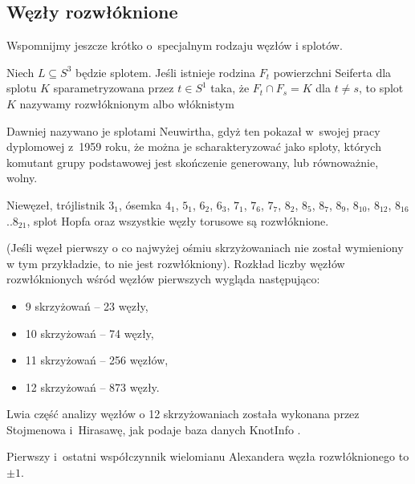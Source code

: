 
\subsection{Węzły rozwłóknione}
%
Wspomnijmy jeszcze krótko o~specjalnym rodzaju węzłów i splotów.

\begin{definition}
    Niech $L \subseteq S^3$ będzie splotem.
    Jeśli istnieje rodzina $F_t$ powierzchni Seiferta dla splotu $K$ sparametryzowana przez $t \in S^1$ taka, że $F_t \cap F_s = K$ dla $t \neq s$, to splot $K$ nazywamy rozwłóknionym albo włóknistym
\end{definition}

%
Dawniej nazywano je splotami Neuwirtha, gdyż ten pokazał w~swojej pracy dyplomowej z~1959 roku, że można je scharakteryzować jako sploty, których komutant grupy podstawowej jest skończenie generowany, lub równoważnie, wolny.

\begin{example}
    Niewęzeł, trójlistnik $3_1$, ósemka $4_1$, $5_{1}$, $6_{2}$, $6_{3}$, $7_{1}$, $7_{6}$, $7_{7}$, $8_{2}$, $8_{5}$, $8_{7}$, $8_{9}$, $8_{10}$, $8_{12}$, $8_{16}$..$8_{21}$, splot Hopfa oraz wszystkie węzły torusowe są rozwłóknione.
\end{example}

(Jeśli węzeł pierwszy o co najwyżej ośmiu skrzyżowaniach nie został wymieniony w tym przykładzie, to nie jest rozwłókniony).
Rozkład liczby węzłów rozwłóknionych wśród węzłów pierwszych wygląda następująco:
\begin{itemize}
\item 9 skrzyżowań -- 23 węzły,
\item 10 skrzyżowań -- 74 węzły,
\item 11 skrzyżowań -- 256 węzłów,
\item 12 skrzyżowań -- 873 węzły.
\end{itemize}

Lwia część analizy węzłów o 12 skrzyżowaniach została wykonana przez Stojmenowa i~Hirasawę, jak podaje baza danych KnotInfo \cite{knotinfo22}.
%
%

\begin{proposition}
%
    Pierwszy i~ostatni współczynnik wielomianu Alexandera węzła rozwłóknionego to $\pm 1$.
\end{proposition}

